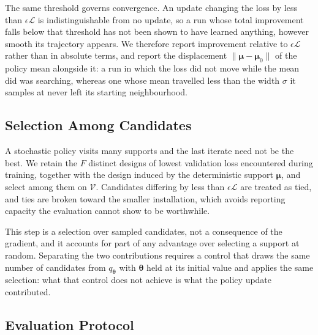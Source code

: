 The same threshold governs convergence. An update changing the loss by
less than $\epsilon\mathcal{L}$ is indistinguishable from no update, so a
run whose total improvement falls below that threshold has not been shown
to have learned anything, however smooth its trajectory appears. We
therefore report improvement relative to $\epsilon\mathcal{L}$ rather
than in absolute terms, and report the displacement
$\|\boldsymbol{\mu}-\boldsymbol{\mu}_0\|$ of the policy mean alongside
it: a run in which the loss did not move while the mean did was
searching, whereas one whose mean travelled less than the width $\sigma$
it samples at never left its starting neighbourhood.

\subsection{Selection Among Candidates}
\label{sec:finalists}

A stochastic policy visits many supports and the last iterate need not be
the best. We retain the $F$ distinct designs of lowest validation loss
encountered during training, together with the design induced by the
deterministic support $\boldsymbol{\mu}$, and select among them on
$\mathcal{V}$. Candidates differing by less than $\epsilon\mathcal{L}$
are treated as tied, and ties are broken toward the smaller installation,
which avoids reporting capacity the evaluation cannot show to be
worthwhile.

This step is a selection over sampled candidates, not a consequence of
the gradient, and it accounts for part of any advantage over selecting a
support at random. Separating the two contributions requires a control
that draws the same number of candidates from $q_{\boldsymbol{\theta}}$
with $\boldsymbol{\theta}$ held at its initial value and applies the same
selection: what that control does not achieve is what the policy update
contributed.

\subsection{Evaluation Protocol}
\label{sec:protocol}

